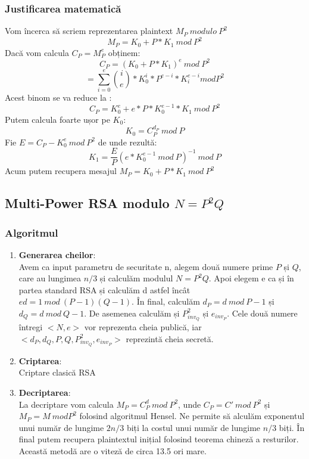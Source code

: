 \documentclass[12]{report}
\begin{document}
		  \subsubsection{Justificarea matematică}
		  Vom încerca să scriem reprezentarea plaintext $M_P \ modulo \ P^2$
		  $$ M_P=K_0 + P*K_1 \ mod \ P^2$$
		  Dacă vom calcula $C_P=M_{P}^{e}$ obținem:
		  $$ C_P = (K_0 + P*K_1)^e \ mod \ P^2$$
		  $$ = \sum_{i=0}^{e} \binom ie * K_{0}^{i} * P^{e-i} * K_{i}^{e-i} mod P^2 $$
		  Acest binom se va reduce la :
		  $$ C_P = K_{0}^{e}  + e*P*K_{0}^{e-1} * K_1 \ mod \ P^2 $$
		  Putem calcula foarte ușor pe $K_0$:
		  $$K_0=C_{P}^{d_P} \ mod \ P$$
		  Fie $E = C_P - K_{0}^{e} \ mod \ P^2$ de unde rezultă:
		  $$ K_1=\frac{E}{P} (e*K_{0}^{e-1} \ mod \ P)^{-1} \ mod \ P $$
		  Acum putem recupera mesajul $M_P = K_0 + P * K_1 \ mod \ P^2$
		  
		  \subsection{Multi-Power RSA modulo $N=P^2Q$}
		  \subsubsection{Algoritmul}
		  \begin{enumerate}
		   \item \textbf{Generarea cheilor}: \\
		   Avem ca input parametru de securitate n, alegem două numere prime $P$ și $Q$, care au lungimea $n/3$ și calculăm modulul $N=P^2Q$. Apoi elegem e ca și în partea standard RSA și calculăm d astfel încât $ed=1 \ mod \ (P-1)(Q-1)$. În final, calculăm $d_P= d \ mod \ P-1$ și $ d_Q=d \ mod \ Q-1$. De asemenea calculăm și $P_{inv_Q}^{2}$ și $e_{inv_P}$. Cele două numere întregi $<N,e>$ vor reprezenta cheia publică, iar $<d_P,d_Q,P,Q,P_{inv_Q}^{2},e_{inv_P}>$ reprezintă cheia secretă. 
		   
		   \item \textbf{Criptarea}: \\
		   Criptare clasică RSA
		   
		   \item \textbf{Decriptarea}: \\
		   La decriptare vom calcula $M_P = C_{P}^{d} \ mod \ P^2$, unde $C_P = C '\ mod \ P^2$ și $M_P = M \ mod P^2$ folosind algoritmul Hensel. Ne permite să alculăm exponentul unui număr de lungime $2n/3$ biți la costul unui număr de lungime $n/3$ biți. În final putem recupera plaintextul inițial folosind teorema chineză a resturilor. Această metodă are o viteză de circa 13.5 ori mare.
		  \end{enumerate}
		  
\end{document}
